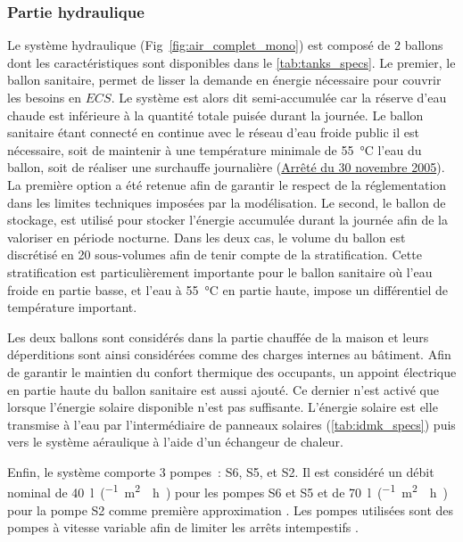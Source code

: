 \subsubsection{Partie hydraulique} %
\label{ssub:partie_hyraulique}
Le système hydraulique (Fig~\ref{fig:air_complet_mono}) est composé de 2 ballons dont les
caractéristiques sont disponibles dans le \autoref{tab:tanks_specs}. Le premier, le ballon
sanitaire, permet de lisser la demande en énergie nécessaire pour couvrir les besoins en
$ECS$. Le système est alors dit semi-accumulée car la réserve d’eau chaude est inférieure
à la quantité totale puisée durant la journée. Le ballon sanitaire étant connecté en
continue avec le réseau d’eau froide public il est nécessaire, soit de maintenir
à une température minimale de \SI{55}{\celsius} l’eau du ballon, soit de réaliser une surchauffe journalière
(\href{https://www.legifrance.gouv.fr/affichTexte.do?cidTexte=JORFTEXT000000423756}{Arrêté
du 30 novembre 2005}). La première option a été retenue afin de garantir le respect de la
réglementation dans les limites techniques imposées par la modélisation. Le second, le
ballon de stockage, est utilisé pour stocker l’énergie accumulée durant la journée afin de
la valoriser en période nocturne. Dans les deux cas, le volume du ballon est discrétisé en 20 sous-volumes
afin de tenir compte de la stratification. Cette stratification est particulièrement
importante pour le ballon sanitaire où l’eau froide en partie basse, et l’eau à \SI{55}{\celsius}
en partie haute, impose un différentiel de température important.

Les deux ballons sont considérés dans la partie chauffée de la maison et leurs
déperditions sont ainsi considérées comme des charges internes au bâtiment. Afin de
garantir le maintien du confort thermique des occupants, un appoint électrique en partie
haute du ballon sanitaire est aussi ajouté. Ce dernier n’est activé que lorsque l’énergie
solaire disponible n’est pas suffisante. L’énergie solaire est elle transmise à
l’eau par l’intermédiaire de panneaux solaires (\autoref{tab:idmk_specs}) puis vers le
système aéraulique à l’aide d’un échangeur de chaleur.

Enfin, le système comporte 3 pompes~: S6, S5, et S2. Il est considéré un débit nominal de
\SI{40}{\litre\per(\meter\squared\period\hour)} pour les pompes S6 et S5 et de
\SI{70}{\litre\per(\meter\squared\period\hour)} pour la pompe S2 comme première
approximation \parencite{Peuser2005}. Les pompes utilisées sont des pompes à vitesse
variable afin de limiter les arrêts intempestifs \parencite{Kicsiny20123489}.

